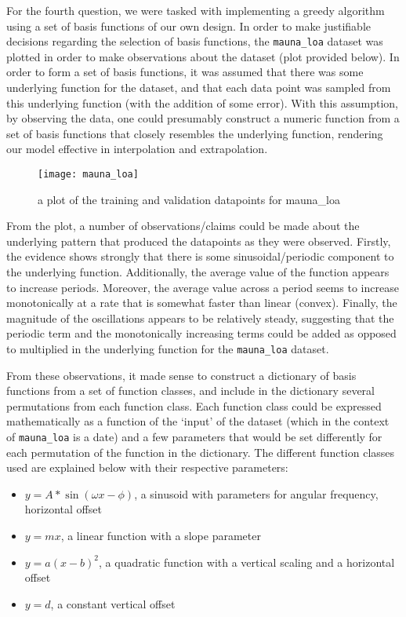 \pagebreak
\fi
{}
For the fourth question, we were tasked with implementing a greedy algorithm using a set of basis functions of our own design. In order to make justifiable decisions regarding the selection of basis functions, the \verb+mauna_loa+ dataset was plotted in order to make observations about the dataset (plot provided below). In order to form a set of basis functions, it was assumed that there was some underlying function for the dataset, and that each data point was sampled from this underlying function (with the addition of some error). With this assumption, by observing the data, one could presumably construct a numeric function from a set of basis functions that closely resembles the underlying function, rendering our model effective in interpolation and extrapolation.

\begin{figure}[H]
\centering
\texttt{[image: mauna\_loa]}
\caption{a plot of the training and validation datapoints for mauna\_loa}
\end{figure}

From the plot, a number of observations/claims could be made about the underlying pattern that produced the datapoints as they were observed. Firstly, the evidence shows strongly that there is some sinusoidal/periodic component to the underlying function. Additionally, the average value of the function appears to increase periods. Moreover, the average value across a period seems to increase monotonically at a rate that is somewhat faster than linear (convex). Finally, the magnitude of the oscillations appears to be relatively steady, suggesting that the periodic term and the monotonically increasing terms could be added as opposed to multiplied in the underlying function for the \verb+mauna_loa+ dataset.

From these observations, it made sense to construct a dictionary of basis functions from a set of function classes, and include in the dictionary several permutations from each function class. Each function class could be expressed mathematically as a function of the `input' of the dataset (which in the context of \verb+mauna_loa+ is a date) and a few parameters that would be set differently for each permutation of the function in the dictionary. The different function classes used are explained below with their respective parameters:

\begin{itemize}
\item $y=A * \sin(\omega x - \phi)$, a sinusoid with parameters for angular frequency, horizontal offset
\item $ y=mx$, a linear function with a slope parameter
\item $ y=a (x - b)^2$, a quadratic function with a vertical scaling and a horizontal offset
\item $ y=d$, a constant vertical offset
\end{itemize}

